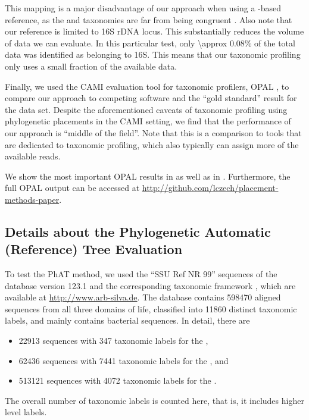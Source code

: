 This mapping is a major disadvantage of our approach when using a -based reference,
as the  and  taxonomies are far from being congruent \citep{Balvociute2017}.
Also note that our reference is limited to 16S rDNA locus. This substantially reduces the volume of data we can evaluate.
In this particular test, only \num{\approx 0.08}\% of the total data was identified as belonging to 16S.
This means that our taxonomic profiling only uses a small fraction of the available data.

Finally, we used the CAMI evaluation tool for taxonomic profilers, OPAL \citep{Sczyrba2017},
to compare our approach to competing software and the ``gold standard'' result for the data set.
Despite the aforementioned caveats of taxonomic profiling using phylogenetic placements in the CAMI setting,
we find that the performance of our approach is ``middle of the field''.
Note that this is a comparison to tools that are dedicated to taxonomic profiling,
which also typically can assign more of the available reads.

We show the most important OPAL results in 
as well as in .
Furthermore, the full OPAL output can be accessed at \url{http://github.com/lczech/placement-methods-paper}.


\subsection{Details about the Phylogenetic Automatic (Reference) Tree Evaluation}
\label{sec:DetailsEvaluationReferenceTrees}

To test the \acf{PhAT} method,
we used the ``SSU Ref NR 99'' sequences of the  database \citep{Quast2013} version 123.1
and the corresponding taxonomic framework \citep{Yilmaz2014}, which are available at \url{http://www.arb-silva.de}.
The database contains \num{598 470} aligned sequences from all three domains of life,
classified into \num{11 860} distinct taxonomic labels,
and mainly contains bacterial sequences.
In detail, there are
\begin{itemize}
    \item \num{ 22 913} sequences with \num{  347} taxonomic labels for the ,
    \item \num{ 62 436} sequences with \num{7 441} taxonomic labels for the , and
    \item \num{513 121} sequences with \num{4 072} taxonomic labels for the .
\end{itemize}
The overall number of taxonomic labels is counted here, that is, it includes higher level labels.

